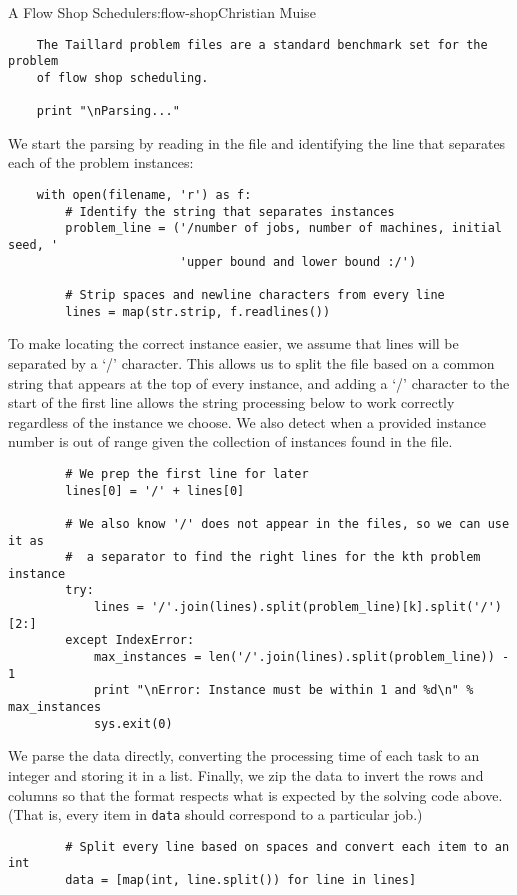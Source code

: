 \begin{aosachapter}{A Flow Shop Scheduler}{s:flow-shop}{Christian Muise}
\begin{verbatim}
    The Taillard problem files are a standard benchmark set for the problem
    of flow shop scheduling. 

    print "\nParsing..."
\end{verbatim}

We start the parsing by reading in the file and identifying the line
that separates each of the problem instances:

\begin{verbatim}
    with open(filename, 'r') as f:
        # Identify the string that separates instances
        problem_line = ('/number of jobs, number of machines, initial seed, '
                        'upper bound and lower bound :/')

        # Strip spaces and newline characters from every line
        lines = map(str.strip, f.readlines())
\end{verbatim}

To make locating the correct instance easier, we assume that lines will
be separated by a `/' character. This allows us to split the file based
on a common string that appears at the top of every instance, and adding
a `/' character to the start of the first line allows the string
processing below to work correctly regardless of the instance we choose.
We also detect when a provided instance number is out of range given the
collection of instances found in the file.

\begin{verbatim}
        # We prep the first line for later
        lines[0] = '/' + lines[0]

        # We also know '/' does not appear in the files, so we can use it as
        #  a separator to find the right lines for the kth problem instance
        try:
            lines = '/'.join(lines).split(problem_line)[k].split('/')[2:]
        except IndexError:
            max_instances = len('/'.join(lines).split(problem_line)) - 1
            print "\nError: Instance must be within 1 and %d\n" % max_instances
            sys.exit(0)
\end{verbatim}

We parse the data directly, converting the processing time of each task
to an integer and storing it in a list. Finally, we zip the data to
invert the rows and columns so that the format respects what is expected
by the solving code above. (That is, every item in \texttt{data} should
correspond to a particular job.)

\begin{verbatim}
        # Split every line based on spaces and convert each item to an int
        data = [map(int, line.split()) for line in lines]


\end{verbatim}
\end{aosachapter}
